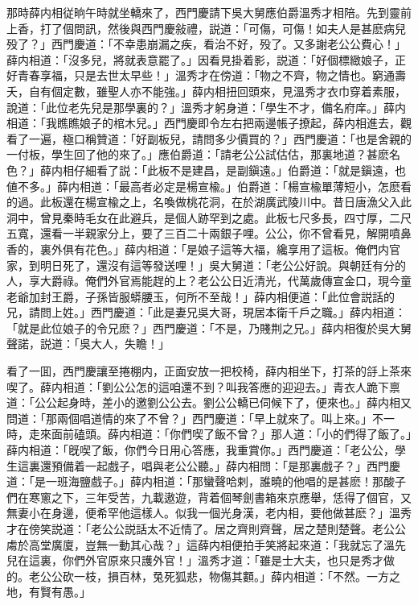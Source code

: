 那時薛内相従晌午時就坐轎來了，西門慶請下吳大舅應伯爵溫秀才相陪。先到靈前上香，打了個問訊，然後與西門慶敍禮，説道：「可傷，可傷！如夫人是甚麽病兒殁了？」西門慶道：「不幸患崩漏之疾，看治不好，殁了。又多謝老公公費心！」薛内相道：「沒多兒，將就表意罷了。」因看見掛着影，説道：「好個標緻娘子，正好青春享福，只是去世太早些！」溫秀才在傍道：「物之不齊，物之情也。窮通壽夭，自有個定數，雖聖人亦不能強。」薛内相扭回頭來，見溫秀才衣巾穿着素服，說道：「此位老先兒是那學裏的？」溫秀才躬身道：「學生不才，備名府庠。」薛内相道：「我瞧瞧娘子的棺木兒。」西門慶即令左右把兩邊帳子撩起，薛内相進去，觀看了一遍，極口稱贊道：「好副板兒，請問多少價買的？」西門慶道：「也是舍親的一付板，學生回了他的來了。」應伯爵道：「請老公公試估估，那裏地道？甚麽名色？」薛内相仔細看了説：「此板不是建昌，是副鎭遠。」伯爵道：「就是鎭遠，也値不多。」薛内相道：「最高者必定是楊宣楡。」伯爵道：「楊宣楡單薄短小，怎麽看的過。此板還在楊宣楡之上，名喚做桃花洞，在於湖廣武陵川中。昔日唐漁父入此洞中，曾見秦時毛女在此避兵，是個人跡罕到之處。此板七尺多長，四寸厚，二尺五寬，還看一半親家分上，要了三百二十兩銀子哩。公公，你不曾看見，解開噴鼻香的，裏外俱有花色。」薛内相道：「是娘子這等大福，纔享用了這板。俺們内官家，到明日死了，還沒有這等發送哩！」吳大舅道：「老公公好說。與朝廷有分的人，享大爵祿。俺們外官焉能趕的上？老公公日近清光，代萬歲傳宣金口，現今童老爺加封王爵，子孫皆服蟒腰玉，何所不至哉！」薛内相便道：「此位會説話的兄，請問上姓。」西門慶道：「此是妻兄吳大哥，現居本衛千戶之職。」薛内相道：「就是此位娘子的令兄麽？」西門慶道：「不是，乃賤荆之兄。」薛内相復於吳大舅聲諾，説道：「吳大人，失瞻！」

看了一囬，西門慶讓至捲棚内，正面安放一把校椅，薛内相坐下，打茶的㧱上茶來喫了。薛内相道：「劉公公怎的這咱還不到？叫我答應的迎迎去。」青衣人跪下禀道：「公公起身時，差小的邀劉公公去。劉公公轎已伺候下了，便來也。」薛内相又問道：「那兩個唱道情的來了不曾？」西門慶道：「早上就來了。叫上來。」不一時，走來面前磕頭。薛内相道：「你們喫了飯不曾？」那人道：「小的們得了飯了。」薛内相道：「旣喫了飯，你們今日用心答應，我重賞你。」西門慶道：「老公公，學生這裏還預備着一起戲子，唱與老公公聽。」薛内相問：「是那裏戲子？」西門慶道：「是一班海鹽戲子。」薛内相道：「那蠻聲哈剌，誰曉的他唱的是甚麽！那酸子們在寒窻之下，三年受苦，九載遨遊，背着個琴劍書箱來京應舉，恁得了個官，又無妻小在身邊，便希罕他這樣人。似我一個光身漢，老内相，要他做甚麽？」溫秀才在傍笑説道：「老公公説話太不近情了。居之齊則齊聲，居之楚則楚聲。老公公䖏於高堂廣廈，豈無一動其心哉？」這薛内相便拍手笑將起來道：「我就忘了溫先兒在這裏，你們外官原來只護外官！」溫秀才道：「雖是士大夫，也只是秀才做的。老公公砍一枝，損百林，兔死狐悲，物傷其䫫。」薛内相道：「不然。一方之地，有賢有愚。」

